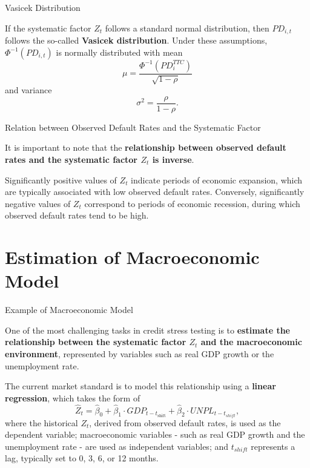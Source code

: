 \documentclass{beamer}
\begin{document}
\begin{frame}{Vasicek Distribution}
\justifying
\small

If the systematic factor $Z_t$ follows a standard normal distribution, then $PD_{i,t}$ follows the so-called \textbf{Vasicek distribution}. Under these assumptions, $\Phi^{-1}(PD_{i,t})$ is normally distributed with mean
\begin{equation}
\mu = \frac{\Phi^{-1}(PD_i^{TTC})}{\sqrt{1 - \rho}}
\end{equation}  
and variance
\begin{equation}
\sigma^2 = \frac{\rho}{1 - \rho}.
\end{equation}

\end{frame}

\begin{frame}{Relation between Observed Default Rates and the Systematic Factor}
\justifying
\small

It is important to note that the \textbf{relationship between observed default rates and the systematic factor $Z_t$ is inverse}.

\medskip

Significantly positive values of $Z_t$ indicate periods of economic expansion, which are typically associated with low observed default rates. 
Conversely, significantly negative values of $Z_t$ correspond to periods of economic recession, during which observed default rates tend to be high.

\end{frame}

\section{Estimation of Macroeconomic Model}

\begin{frame}{Example of Macroeconomic Model}
\justifying
\small

One of the most challenging tasks in credit stress testing is to \textbf{estimate the relationship between the systematic factor $Z_t$ and the macroeconomic environment}, represented by variables such as real GDP growth or the unemployment rate.

\medskip
 
The current market standard is to model this relationship using a \textbf{linear regression}, which takes the form of
\begin{equation*}
\widehat{Z}_t = \widehat{\beta}_0 + \widehat{\beta}_1 \cdot GDP_{t - t_{\mathrm{shift}}} + \widehat{\beta}_2 \cdot UNPL_{t - t_{shift}}, 
\end{equation*}
where the historical $Z_t$, derived from observed default rates, is used as the dependent variable; macroeconomic variables - such as real GDP growth and the unemployment rate - are used as independent variables; and $t_{shift}$ represents a lag, typically set to 0, 3, 6, or 12 months.

\end{frame}
\end{document}
